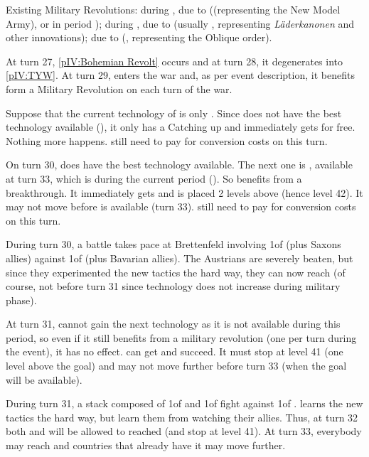 \aparag Existing Military Revolutions:
\bparag during , due to 
(\TBAR (representing the New Model Army), or \TARQ in period );
\bparag during , due to  (usually
\TBAR, representing \emph{L\"{a}derkanonen} and other innovations);
\bparag due to  (\TL, representing the Oblique order).

\begin{exemple}
  At turn 27, \ref{pIV:Bohemian Revolt} occurs and at turn 28, it degenerates
  into \ref{pIV:TYW}. At turn 29, \SUE enters the war and, as per event
  description, it benefits form a Military Revolution on each turn of the war.

  Suppose that the current technology of \SUE is only \TARQ. Since \SUE does
  not have the best technology available (\TMUS), it only has a Catching up
  and immediately gets \TMUS for free. Nothing more happens. \SUE still need
  to pay for conversion costs on this turn.

  On turn 30, \SUE does have the best technology available. The next one is
  \TBAR, available at turn 33, which is during the current period
  (). So \SUE benefits from a breakthrough. It immediately gets
  \TBAR and is placed 2 levels above (hence level 42). It may not move before
  \TBAR is available (turn 33). \SUE still need to pay for conversion costs on
  this turn.

  During turn 30, a battle takes pace at Brettenfeld involving 1\ARMY of \SUE
  (plus Saxons allies) against 1\ARMY of \AUS (plus Bavarian allies). The
  Austrians are severely beaten, but since they experimented the new tactics
  the hard way, they can now reach \TBAR (of course, not before turn 31 since
  technology does not increase during military phase).

  At turn 31, \SUE cannot gain the next technology as it is not available
  during this period, so even if it still benefits from a military revolution
  (one per turn during the event), it has no effect. \AUS can get \TBAR and
  succeed. It must stop at level 41 (one level above the goal) and may not
  move further before turn 33 (when the goal will be available).

  During turn 31, a stack composed of 1\ARMY of \AUS and 1\ARMY of \HIS fight
  against 1\ARMY of \HOL. \HOL learns the new tactics the hard way, but \HIS
  learn them from watching their allies. Thus, at turn 32 both \HOL and \HIS
  will be allowed to reached \TBAR (and stop at level 41). At turn 33,
  everybody may reach \TBAR and countries that already have it may move
  further.
\end{exemple}



